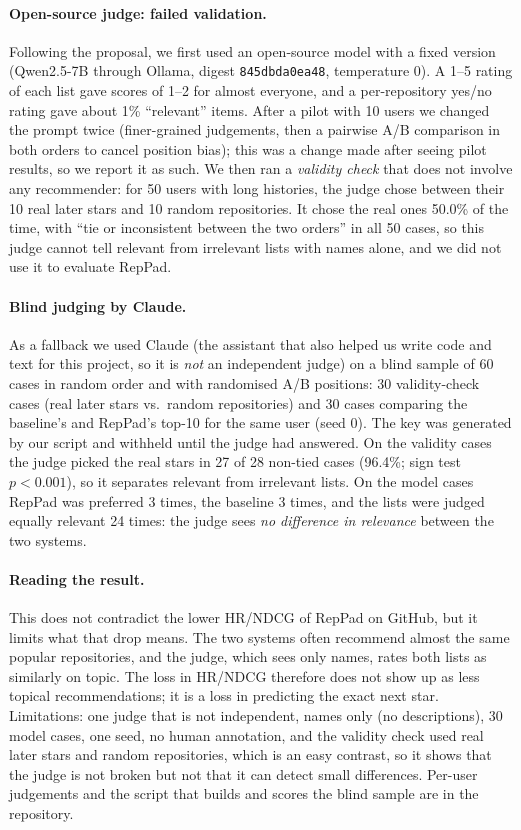 \documentclass[11pt]{article}
\begin{document}
\paragraph{Open-source judge: failed validation.}
Following the proposal, we first used an open-source model with a fixed version (Qwen2.5-7B
through Ollama, digest \texttt{845dbda0ea48}, temperature 0). A 1--5 rating of each list gave scores of
1--2 for almost everyone, and a per-repository yes/no rating gave about 1\% ``relevant'' items. After a pilot
with 10 users we changed the prompt twice (finer-grained judgements, then a pairwise A/B comparison
in both orders to cancel position bias); this was a change made after seeing pilot results, so we
report it as such. We then ran a \emph{validity check} that does not involve any recommender: for 50
users with long histories, the judge chose between their 10 real later stars and 10 random repositories.
It chose the real ones 50.0\% of the time, with ``tie or inconsistent between the two orders'' in all
50 cases, so this judge cannot tell relevant from irrelevant lists with names alone, and we did not use it
to evaluate RepPad.

\paragraph{Blind judging by Claude.}
As a fallback we used Claude (the assistant that also helped us write code and text for this project,
so it is \emph{not} an independent judge) on a blind sample of 60 cases in random order and with
randomised A/B positions: 30 validity-check cases (real later stars vs.\ random repositories) and
30 cases comparing the baseline's and RepPad's top-10 for the same user (seed 0). The key was
generated by our script and withheld until the judge had answered. On the validity cases the judge picked the
real stars in 27 of 28 non-tied cases (96.4\%; sign test $p<0.001$), so it separates
relevant from irrelevant lists. On the model cases RepPad was preferred 3 times, the baseline 3 times,
and the lists were judged equally relevant 24 times: the judge sees \emph{no difference in relevance}
between the two systems.

\paragraph{Reading the result.}
This does not contradict the lower HR/NDCG of RepPad on GitHub, but it limits what that drop means.
The two systems often recommend almost the same popular repositories, and the judge, which sees only names,
rates both lists as similarly on topic. The loss in HR/NDCG therefore does not show up as less topical
recommendations; it is a loss in predicting the exact next star. Limitations: one judge that is not
independent, names only (no descriptions), 30 model cases, one seed, no human annotation, and the
validity check used real later stars and random repositories, which is an easy contrast, so it shows that the
judge is not broken but not that it can detect small differences. Per-user judgements and the
script that builds and scores the blind sample are in the repository.
\end{document}
